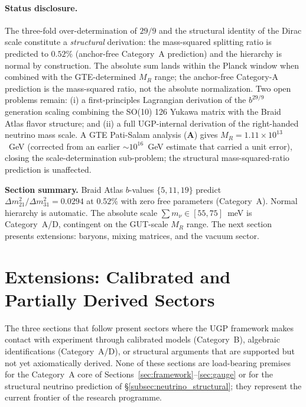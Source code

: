 \documentclass[11pt]{article}
\theoremstyle{remark}
\newcommand{\CatA}{\textbf{A}}
\begin{document}
\paragraph{Status disclosure.}
The three-fold over-determination of $29/9$ and the structural identity of the Dirac scale constitute a \emph{structural} derivation: the mass-squared splitting ratio is predicted to $0.52\%$ (anchor-free Category~A prediction) and the hierarchy is normal by construction.  The absolute sum lands within the Planck window when combined with the GTE-determined $M_R$ range; the anchor-free Category-A prediction is the mass-squared ratio, not the absolute normalization.  Two open problems remain: (i) a first-principles Lagrangian derivation of the $b^{29/9}$ generation scaling combining the SO(10) 126 Yukawa matrix with the Braid Atlas flavor structure; and (ii) a full UGP-internal derivation of the right-handed neutrino mass scale.  A GTE Pati-Salam analysis (\CatA) gives $M_R = 1.11\times10^{13}$~GeV (corrected from an earlier ${\sim}10^{16}$~GeV estimate that carried a unit error), closing the scale-determination sub-problem; the structural mass-squared-ratio prediction is unaffected.

\begin{tcolorbox}[colback=gray!4,colframe=gray!40,left=5pt,right=5pt,top=3pt,bottom=3pt]
\small\textbf{Section summary.}
Braid Atlas $b$-values $\{5,11,19\}$ predict $\Delta m^2_{21}/\Delta m^2_{31} = 0.0294$ at $0.52\%$ with zero free parameters (Category~A).  Normal hierarchy is automatic.  The absolute scale $\sum m_\nu \in [55,75]$~meV is Category~A/D, contingent on the GUT-scale $M_R$ range.
The next section presents extensions: baryons, mixing matrices, and the vacuum sector.
\end{tcolorbox}

\section{Extensions: Calibrated and Partially Derived Sectors}
\label{sec:extensions}

The three sections that follow present sectors where the UGP framework makes contact with
experiment through calibrated models (Category~B), algebraic identifications (Category~A/D),
or structural arguments that are supported but not yet axiomatically derived.
None of these sections are load-bearing premises for the Category~A core of
Sections~\ref{sec:framework}--\ref{sec:gauge} or for the structural neutrino prediction of
\S\ref{subsec:neutrino_structural}; they represent the current frontier of the research programme.
\end{document}
